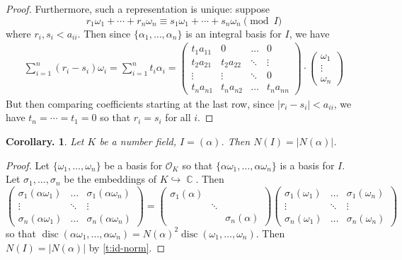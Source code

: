 \documentclass[11pt, a4paper]{memoir}
\DeclareMathOperator{\C}{{\mathbb{C}}}
\newcommand{\hto}[0]{\ensuremath{\hookrightarrow}}
\theoremstyle{change}
\newtheorem{corollary}[theorem]{Corollary.}
\theoremstyle{plain}
\theoremstyle{nonumberplain}
\newtheorem{proof}{Proof}
\DeclareMathOperator{\disc}{disc}
\numberwithin{equation}{section}
\begin{document}
\begin{proof}
    Furthermore, such a representation is unique: suppose
    \begin{equation*}
        r_1\omega_1+\cdots+r_n\omega_n\equiv s_1\omega_1+\cdots+s_n\omega_n\pmod{I}
    \end{equation*}
    where $r_i,s_i<a_{ii}$.
    Then since $\{\alpha_1,\ldots,\alpha_n\}$ is an integral basis for $I$, we have
    \begin{align*}
        \sum_{i=1}^n(r_i-s_i)\omega_i = \sum_{i=1}^n t_i\alpha_i = 
        \begin{pmatrix}
            t_1a_{11}&0&\hdots&0\\
            t_2a_{21}&t_2a_{22}&\ddots&\vdots\\
            \vdots&\vdots&\ddots&0\\
            t_na_{n1}&t_na_{n2}&\hdots&t_na_{nn}
        \end{pmatrix}\cdot
        \begin{pmatrix}
            \omega_1\\\vdots\\\omega_n
        \end{pmatrix}
    \end{align*}
    But then comparing coefficients starting at the last row, since $|r_i-s_i|<a_{ii}$, we have $t_n=\cdots=t_1=0$ so that $r_i=s_i$ for all $i$.
\end{proof}
\begin{corollary}
    Let $K$ be a number field, $I=(\alpha)$.
    Then $N(I)=|N(\alpha)|$.
\end{corollary}
\begin{proof}
    Let $\{\omega_1,\ldots,\omega_n\}$ be a basis for $\mathcal{O}_K$ so that $\{\alpha\omega_1,\ldots,\alpha\omega_n\}$ is a basis for $I$.
    Let $\sigma_1,\ldots,\sigma_n$ be the embeddings of $K\hto\C$.
    Then
    \begin{equation*}
        \begin{pmatrix}
            \sigma_1(\alpha\omega_1) &\hdots&\sigma_1(\alpha\omega_n)\\
            \vdots&\ddots&\vdots\\
            \sigma_n(\alpha\omega_1) &\hdots&\sigma_n(\alpha\omega_n)
        \end{pmatrix}
        =
        \begin{pmatrix}
            \sigma_1(\alpha) &&\\
                             &\ddots&\\
                             &&\sigma_n(\alpha)
        \end{pmatrix}
        \begin{pmatrix}
            \sigma_1(\omega_1) &\hdots&\sigma_1(\omega_n)\\
            \vdots&\ddots&\vdots\\
            \sigma_n(\omega_1) &\hdots&\sigma_n(\omega_n)
        \end{pmatrix}
    \end{equation*}
    so that $\disc(\alpha\omega_1,\ldots,\alpha\omega_n)=N(\alpha)^2\disc(\omega_1,\ldots,\omega_n)$.
    Then $N(I)=|N(\alpha)|$ by \cref{t:id-norm}.
\end{proof}
\end{document}
